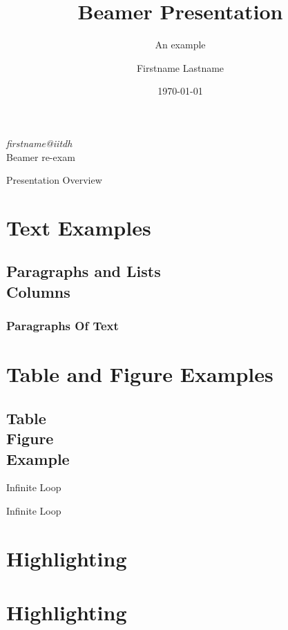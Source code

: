 \documentclass{beamer}
\begin{document}
\title{Beamer Presentation}
\subtitle{An example}
\author{\textnormal{Firstname Lastname}}
\begin{frame} [plain]
\titlepage 
\centering
\textit{firstname@iitdh} \\
\textnormal{Beamer re-exam}\\
\date{\today}
\end{frame}

\begin{frame}{Presentation Overview}
\tableofcontents
\end{frame}

\section{Text Examples}
\subsection{Paragraphs and Lists \\ Columns}
	\begin{frame}
	\frametitle{Paragraphs Of Text}
	
		
		
		
		
	\end{frame}
	
\section{Table and Figure Examples}
\subsection{Table \\ Figure \\ Example}

	\begin{frame}[label=first]{Infinite Loop}
		\hyperlink{last}{}
	\end{frame}
	
	\begin{frame}[label=last]{Infinite Loop}
		\hyperlink{first}{}
	\end{frame}
	
\section{Highlighting}


\section{Highlighting}
	
\end{document}
